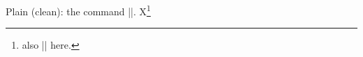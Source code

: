 \documentclass{article}
\begin{document}
Plain (clean): the command |\multicolumn|.
X\footnote{also |\multicolumn| here.}
\end{document}
